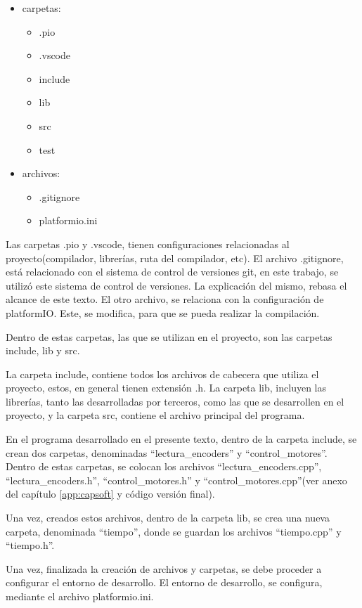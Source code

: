 \begin{itemize}
	\item carpetas: 
	\begin{itemize}
		\item .pio 
		\item .vscode 
		\item include 
		\item lib 
		\item src 
		\item test 	
	\end{itemize}
	\item archivos: 
	\begin{itemize}
		\item .gitignore 
		\item platformio.ini  
	\end{itemize}
\end{itemize}

Las carpetas .pio y .vscode, tienen configuraciones relacionadas al proyecto(compilador, librerías, ruta del compilador, etc). El archivo .gitignore, está relacionado con el sistema de control de versiones git, en este trabajo, se utilizó este sistema de control de versiones. La explicación del mismo, rebasa el alcance de este texto. El otro archivo, se relaciona con la configuración de platformIO. Este, se modifica, para que se pueda realizar la compilación. 

Dentro de estas carpetas, las que se utilizan en el proyecto, son las carpetas include, lib y src. 

La carpeta include, contiene todos los archivos de cabecera que utiliza el proyecto, estos, en general tienen extensión .h. La carpeta lib, incluyen las librerías, tanto las desarrolladas por terceros, como las que se desarrollen en el proyecto, y la carpeta src, contiene el archivo principal del programa. 

En el programa desarrollado en el presente texto, dentro de la carpeta include, se crean dos carpetas, denominadas ``lectura\_encoders'' y ``control\_motores''. Dentro de estas carpetas, se colocan los archivos ``lectura\_encoders.cpp'',  ``lectura\_encoders.h'',  ``control\_motores.h'' y ``control\_motores.cpp''(ver anexo del capítulo \ref{app:capsoft} y código versión final). 

Una vez, creados estos archivos, dentro de la carpeta lib, se crea una nueva carpeta, denominada ``tiempo'', donde se guardan los archivos ``tiempo.cpp'' y ``tiempo.h''. 

Una vez, finalizada la creación de archivos y carpetas, se debe proceder a configurar el entorno de desarrollo. El entorno de desarrollo, se configura, mediante el archivo platformio.ini. 

